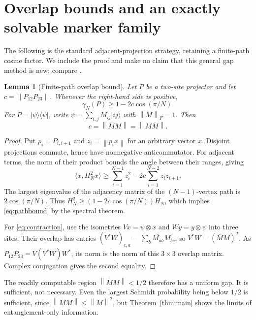 \documentclass[11pt,a4paper]{article}
\newtheorem{lemma}[theorem]{Lemma}
\theoremstyle{remark}\newtheorem{remark}[theorem]{Remark}
\newcommand{\ket}[1]{\lvert #1\rangle}
\newcommand{\bra}[1]{\langle #1\rvert}
\newcommand{\norm}[1]{\left\lVert #1\right\rVert}
\begin{document}
\section{Overlap bounds and an exactly solvable marker family}
The following is the standard adjacent-projection strategy, retaining a finite-path cosine factor. We include the proof and make no claim that this general gap method is new; compare \cite{Lemm,HJL}.
\begin{lemma}[Finite-path overlap bound]\label{lem:overlap}
Let $P$ be a two-site projector and let $c=\norm{P_{12}P_{23}}$. Whenever the right-hand side is positive,
\begin{equation}\label{eq:pathbound}
 \gamma_N(P)\ge1-2c\cos(\pi/N).
\end{equation}
For $P=\ket\psi\bra\psi$, write $\psi=\sum_{i,j}M_{ij}\ket{ij}$ with $\norm M_F=1$. Then
\begin{equation}\label{eq:contraction}
 c=\norm{\overline M M}=\norm{M\overline M}.
\end{equation}
\end{lemma}
\begin{proof}
Put $p_i=P_{i,i+1}$ and $z_i=\norm{p_i x}$ for an arbitrary vector $x$. Disjoint projections commute, hence have nonnegative anticommutator. For adjacent terms, the norm of their product bounds the angle between their ranges, giving
\[
 \langle x,H_N^2x\rangle\ge\sum_{i=1}^{N-1}z_i^2
       -2c\sum_{i=1}^{N-2}z_i z_{i+1}.
\]
The largest eigenvalue of the adjacency matrix of the $(N-1)$-vertex path is $2\cos(\pi/N)$. Thus $H_N^2\ge(1-2c\cos(\pi/N))H_N$, which implies \eqref{eq:pathbound} by the spectral theorem.

For \eqref{eq:contraction}, use the isometries $Vx=\psi\otimes x$ and $Wy=y\otimes\psi$ into three sites. Their overlap has entries
$(V^*W)_{c,a}=\sum_b\overline{M_{ab}}M_{bc}$, so
$V^*W=(\overline M M)^T$. As $P_{12}P_{23}=V(V^*W)W^*$, its norm is the norm of this $3\times3$ overlap matrix. Complex conjugation gives the second equality.
\end{proof}
The readily computable region $\norm{\overline M M}<1/2$ therefore has a uniform gap. It is sufficient, not necessary. Even the largest Schmidt probability being below $1/2$ is sufficient, since $\norm{\overline M M}\le\norm M^2$, but Theorem~\ref{thm:main} shows the limits of entanglement-only information.
\end{document}
